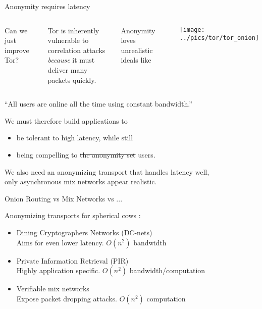 \documentclass[fleqn,xcolor={usenames,dvipsnames}]{beamer}
\begin{document}


\begin{frame}[t]{Anonymity requires latency}
\begin{columns}[T]
\hspace*{20pt} Can we just improve Tor?

\medskip

\hspace*{5pt} Tor is inherently vulnerable to correlation attacks \\
 \hspace*{10pt} {\em because} it must deliver many packets quickly.

\bigskip 

\hspace*{5pt} Anonymity loves unrealistic ideals like

\texttt{[image: ../pics/tor/tor\_onion]}
\end{columns}
\smallskip
\hspace*{1pt} ``All users are online all the time using constant bandwidth.''

\bigskip
\pause

\noindent We must therefore build applications to
\begin{itemize}
\item be tolerant to high latency, while still
\item being compelling to \sout{the anonymity set} users.
\end{itemize}

\smallskip

We also need an anonymizing transport that handles latency well, \\
\hspace*{2pt} only asynchronous mix networks appear realistic.

\end{frame}


\begin{frame}[t]{Onion Routing vs Mix Networks vs ...}

Anonymizing transports for spherical cows :
\begin{itemize}
\item Dining Cryptographers Networks (DC-nets) \\
 \hspace*{2pt} Aims for even lower latency. $O(n^2)$ bandwidth
\item Private Information Retrieval (PIR) \\
 \hspace*{2pt} Highly application specific.  $O(n^2)$ bandwidth/computation
\item Verifiable mix networks \\
 \hspace*{2pt} Expose packet dropping attacks. $O(n^2)$ computation
\end{itemize}

\end{frame}
\end{document}
